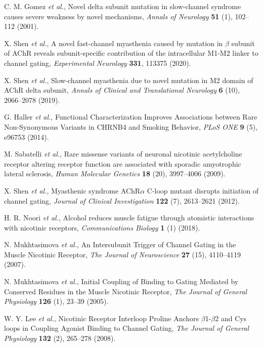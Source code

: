 C. M. Gomez {\em et al.}, Novel delta subunit mutation in slow-channel syndrome causes severe weakness by novel mechanisms, {\em Annals of Neurology} {\bf 51} (1), 102--112 (2001).

X. Shen {\em et al.}, A novel fast-channel myasthenia caused by mutation in $\beta$ subunit of AChR reveals subunit-specific contribution of the intracellular M1-M2 linker to channel gating, {\em Experimental Neurology} {\bf 331}, 113375 (2020).

X. Shen {\em et al.}, Slow-channel myasthenia due to novel mutation in M2 domain of AChR delta subunit, {\em Annals of Clinical and Translational Neurology} {\bf 6} (10), 2066--2078 (2019).

G. Haller {\em et al.}, Functional Characterization Improves Associations between Rare Non-Synonymous Variants in CHRNB4 and Smoking Behavior, {\em PLoS ONE} {\bf 9} (5), e96753 (2014).

M. Sabatelli {\em et al.}, Rare missense variants of neuronal nicotinic acetylcholine receptor altering receptor function are associated with sporadic amyotrophic lateral sclerosis, {\em Human Molecular Genetics} {\bf 18} (20), 3997--4006 (2009).

X. Shen {\em et al.}, Myasthenic syndrome AChR$\alpha$ C-loop mutant disrupts initiation of channel gating, {\em Journal of Clinical Investigation} {\bf 122} (7), 2613--2621 (2012).

H. R. Noori {\em et al.}, Alcohol reduces muscle fatigue through atomistic interactions with nicotinic receptors, {\em Communications Biology} {\bf 1} (1) (2018).

N. Mukhtasimova {\em et al.}, An Intersubunit Trigger of Channel Gating in the Muscle Nicotinic Receptor, {\em The Journal of Neuroscience} {\bf 27} (15), 4110--4119 (2007).

N. Mukhtasimova {\em et al.}, Initial Coupling of Binding to Gating Mediated by Conserved Residues in the Muscle Nicotinic Receptor, {\em The Journal of General Physiology} {\bf 126} (1), 23--39 (2005).

W. Y. Lee {\em et al.}, Nicotinic Receptor Interloop Proline Anchors $\beta$1-$\beta$2 and Cys loops in Coupling Agonist Binding to Channel Gating, {\em The Journal of General Physiology} {\bf 132} (2), 265--278 (2008).

